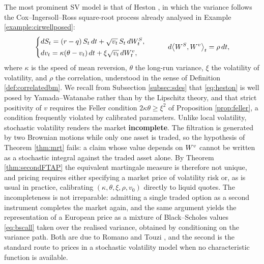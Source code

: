 The most prominent SV model is that of Heston \cite{heston1993}, in which the variance follows the 
Cox--Ingersoll--Ross square-root process already analysed in Example \ref{example:cirwellposed}:
\begin{equation}\label{eq:heston}
    \begin{cases}
        dS_t = (r-q)\,S_t\,dt + \sqrt{v_t}\,S_t\,dW_t^{S},\\[2pt]
        dv_t = \kappa (\theta - v_t)\,dt + \xi \sqrt{v_t}\,dW_t^{v},
    \end{cases}
    \qquad d\bigl\langle W^{S}, W^{v}\bigr\rangle_t = \rho\,dt,
\end{equation}
where $\kappa$ is the speed of mean reversion, $\theta$ the long-run variance, $\xi$ the volatility 
of volatility, and $\rho$ the correlation, understood in the sense of Definition 
\ref{def:correlatedbm}. We recall from Subsection \ref{subsec:sdes} that \eqref{eq:heston} is well 
posed by Yamada--Watanabe rather than by the Lipschitz theory, and that strict positivity of $v$ 
requires the Feller condition $2\kappa\theta \geq \xi^2$ of Proposition \ref{prop:feller}, a 
condition frequently violated by calibrated parameters. Unlike local volatility, stochastic volatility renders the market \textbf{incomplete}. The filtration is generated by 
two Brownian motions while only one asset is traded, so the hypothesis of Theorem \ref{thm:mrt} 
fails: a claim whose value depends on $W^v$ cannot be written as a stochastic integral against the 
traded asset alone. By Theorem \ref{thm:secondFTAP} the equivalent martingale measure is therefore 
not unique, and pricing requires either specifying a market price of volatility risk or, as is usual in practice, calibrating
$(\kappa,\theta,\xi,\rho,v_0)$ directly to liquid quotes. The incompleteness is not irreparable:
admitting a single traded option as a second instrument completes the market again, and the same
argument yields the representation of a European price as a mixture of Black--Scholes values
\eqref{eq:bscall} taken over the realised variance, obtained by conditioning on the variance path.
Both are due to Romano and Touzi \cite{romanotouzi1997}, and the second is the standard route to
prices in a stochastic volatility model when no characteristic function is available.


